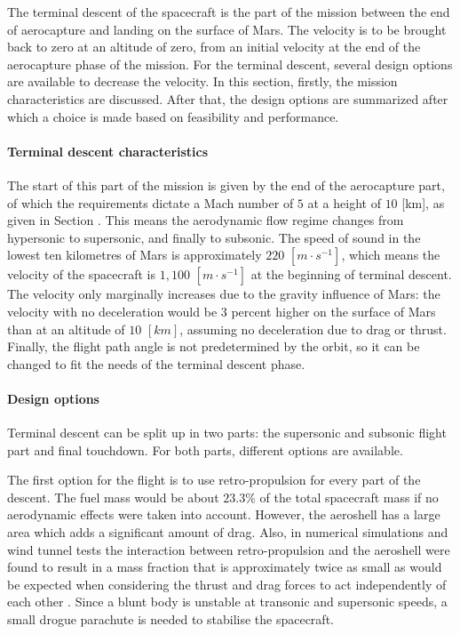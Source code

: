 The terminal descent of the spacecraft is the part of the mission between the end of aerocapture and landing on the surface of Mars. The velocity is to be brought back to zero at an altitude of zero, from an initial velocity at the end of the aerocapture phase of the mission. For the terminal descent, several design options are available to decrease the velocity. In this section, firstly, the mission characteristics are discussed. After that, the design options are summarized after which a choice is made based on feasibility and performance.

\paragraph{Terminal descent characteristics}
The start of this part of the mission is given by the end of the aerocapture part, of which the requirements dictate a Mach number of $5$ at a height of $10$ [km], as given in Section \label{sec:missionreq}. This means the aerodynamic flow regime changes from hypersonic to supersonic, and finally to subsonic. The speed of sound in the lowest ten kilometres of Mars is approximately $220$ $[m\cdot s^{-1}]$, which means the velocity of the spacecraft is $1,100$ $[m\cdot s^{-1}]$ at the beginning of terminal descent. The velocity only marginally increases due to the gravity influence of Mars: the velocity with no deceleration would be 3 percent higher on the surface of Mars than at an altitude of $10$ $[km]$, assuming no deceleration due to drag or thrust. Finally, the flight path angle is not predetermined by the orbit, so it can be changed to fit the needs of the terminal descent phase.

\paragraph{Design options}
Terminal descent can be split up in two parts: the supersonic and subsonic flight part and final touchdown. For both parts, different options are available.

The first option for the flight is to use retro-propulsion for every part of the descent. The fuel mass would be about $23.3\%$ of the total spacecraft mass if no aerodynamic effects were taken into account. However, the aeroshell has a large area which adds a significant amount of drag. Also, in numerical simulations and wind tunnel tests the interaction between retro-propulsion and the aeroshell were found to result in a mass fraction that is approximately twice as small as would be expected when considering the thrust and drag forces to act independently of each other \cite{Korzun2009}. Since a blunt body is unstable at transonic and supersonic speeds, a small drogue parachute is needed to stabilise the spacecraft.

